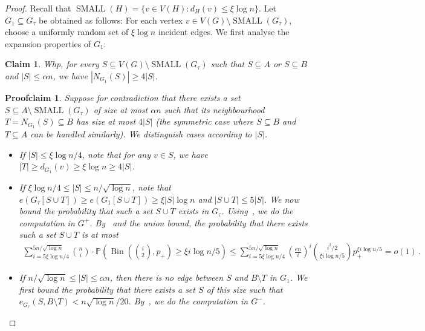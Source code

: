\documentclass[10pt,a4paper]{amsart}
\newtheorem{claim}{Claim}
\newtheorem{proofclaim}{Proofclaim}
\newcommand{\Bin}{\operatorname{Bin}}
\renewcommand{\Pr}{\mathbb{P}}
\newcommand{\SMA}{\operatorname{SMALL}}
\begin{document}
\begin{proof}
    Recall that $\SMA(H) = \{v\in V(H): d_{H}(v)\leq \xi \log n\}$. 
    Let $G_1\subseteq G_\tau$ be obtained as follows: For each vertex $v\in V(G)\setminus \SMA(G_\tau)$, choose a uniformly random set of $\xi\log n$ incident edges. 
    We first analyse the expansion properties of $G_1$:
    \begin{claim}\label{claim:4-expander}
        Whp, for every $S\subseteq V(G)\setminus \SMA(G_\tau)$ such that $S\subseteq A$ or $S\subseteq B$ and $|S|\leq \alpha n$, we have $|N_{G_1}(S)|\geq 4|S|$.
    \end{claim}
    \begin{proofclaim}
        Suppose for contradiction that there exists a set $S\subseteq A\setminus \SMA(G_\tau)$ of size at most $\alpha n$ such that its neighbourhood $T = N_{G_1}(S)\subseteq B$ has size at most $4|S|$ (the symmetric case where $S\subseteq B$ and $T\subseteq A$ can be handled similarly).
        We distinguish cases according to $|S|$. 
        \begin{itemize}
            \item If $|S|\leq \xi \log n/4$, note that for any $v\in S$, we have $|T|\geq d_{G_1}(v) \geq \xi \log n\geq 4|S|$. 
            \item If $\xi\log n/4\leq |S|\leq n/\sqrt{\log n}$, note that $e(G_\tau[S\cup T]) \geq e(G_1[S\cup T])\geq \xi|S|\log n$ and $|S\cup T|\leq 5|S|$. 
            We now bound the probability that such a set $S\cup T$ exists in $G_\tau$.
            Using~, we do the computation in $G^+$.
            By~ and the union bound, the probability that there exists such a set $S\cup T$ is at most
            \begin{multline*}
                \sum_{i= 5\xi\log n/4}^{5n/\sqrt{\log n}}\binom{n}{i}\cdot \Pr\left(\Bin\left(\binom{i}{2},p_+\right) \geq \xi i\log n/5\right)
                \leq \sum_{i= 5\xi\log n/4}^{5n/\sqrt{\log n}}\left(\frac{en}{i}\right)^i \binom{i^2/2}{\xi i\log n/5} p_+^{\xi i\log n/5} = o(1)\,.
            \end{multline*}
            \item If $n/\sqrt{\log n}\leq |S|\leq \alpha n$, then there is no edge between $S$ and $B\setminus T$ in $G_1$. 
            We first bound the probability that there exists a set $S$ of this size such that $e_{G_\tau}(S,B\setminus T)< n\sqrt{\log n}/20$.
            By~, we do the computation in $G^-$.
            

\end{itemize}
\end{proofclaim}
\end{proof}
\end{document}
